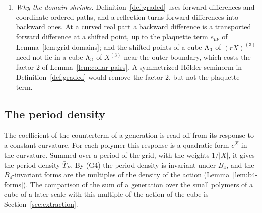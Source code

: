 \begin{remark}
\begin{enumerate}[label=(\alph*)]
\[\]
since $L\ge3$ and $\delta_1\le\delta_0$. This replaces the slack $\frac12\delta_1$ of the domains $\mathcal U$ by $\frac18\delta_1$; it multiplies $\tau$ by $4$, and (Q3) remains a condition $\tau\le C_PL^dg_kp_{0,k}/\delta_1<\frac12$ with a larger $C_P$. At later scales $k>j$ the generation enters the step through the activities $\Psi_\Box$ and $E^{\rm ne}_Y$ of Section~\ref{sec:extraction}, which are bounded on the domains $\mathcal U^\flat$ of scale $k$; so the slack is again $\frac18\delta_1$. The single activities $E(X,\cdot)$ are defined on the whole domain $\mathcal U$ of scale $k$, since its points lie in $\mathcal U(X;L^{-2(k-j)}\theta_r,L^{-2(k-j)}\delta_1,L^{-(k-j)}\delta_0)\subset\mathcal U^\flat(X)$ (Remark~\ref{rem:domain-constants}(i)).
\item \emph{Why the domain shrinks.} Definition~\ref{def:graded} uses forward differences and coordinate-ordered paths, and a reflection turns forward differences into backward ones. At a curved real part a backward difference is a transported forward difference at a shifted point, up to the plaquette term $e_{\mu\nu}$ of Lemma~\ref{lem:grid-domains}; and the shifted points of a cube $\Lambda_3$ of $(rX)^{(3)}$ need not lie in a cube $\Lambda_3$ of $X^{(3)}$ near the outer boundary, which costs the factor $2$ of Lemma~\ref{lem:collar-pairs}. A symmetrized H\"older seminorm in Definition~\ref{def:graded} would remove the factor $2$, but not the plaquette term.
\end{enumerate}
\end{remark}

\subsection{The period density}\label{subsec:gen-period}

The coefficient of the counterterm of a generation is read off from its response to a constant curvature. For each polymer this response is a quadratic form $c^X$ in the curvature. Summed over a period of the grid, with the weights $1/|X|$, it gives the period density $\bar T_E$. By (G4) the period density is invariant under $B_4$, and the $B_4$-invariant forms are the multiples of the density of the action (Lemma~\ref{lem:b4-forms}). The comparison of the sum of a generation over the small polymers of a cube of a later scale with this multiple of the action of the cube is Section~\ref{sec:extraction}.

